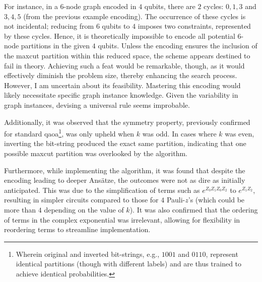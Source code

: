 For instance, in a $6$-node graph encoded in $4$ qubits, there are $2$ cycles: $0, 1, 3$ and $3, 4, 5$ (from the previous example encoding). The occurrence of these cycles is not incidental; reducing from $6$ qubits to $4$ imposes two constraints, represented by these cycles. Hence, it is theoretically impossible to encode all potential $6$-node partitions in the given $4$ qubits. Unless the encoding ensures the inclusion of the \acrshort{maxcut} partition within this reduced space, the scheme appears destined to fail in theory. Achieving such a feat would be remarkable, though, as it would effectively diminish the problem size, thereby enhancing the search process. However, I am uncertain about its feasibility. Mastering this encoding would likely necessitate specific graph instance knowledge. Given the variability in graph instances, devising a universal rule seems improbable.

Additionally, it was observed that the symmetry property, previously confirmed for standard \acrshort{qaoa}\footnote{Wherein original and inverted bit-strings, e.g., $1001$ and $0110$, represent identical partitions (though with different labels) and are thus trained to achieve identical probabilities.}, was only upheld when $k$ was odd. In cases where $k$ was even, inverting the bit-string produced the exact same partition, indicating that one possible \acrshort{maxcut} partition was overlooked by the algorithm.

Furthermore, while implementing the algorithm, it was found that despite the encoding leading to deeper Ansätze, the outcomes were not as dire as initially anticipated. This was due to the simplification of terms such as $e^{Z_0Z_1Z_0Z_2}$ to $e^{Z_1Z_2}$, resulting in simpler circuits compared to those for $4$ Pauli-$z$'s (which could be more than $4$ depending on the value of $k$). It was also confirmed that the ordering of terms in the complex exponential was irrelevant, allowing for flexibility in reordering terms to streamline implementation.

